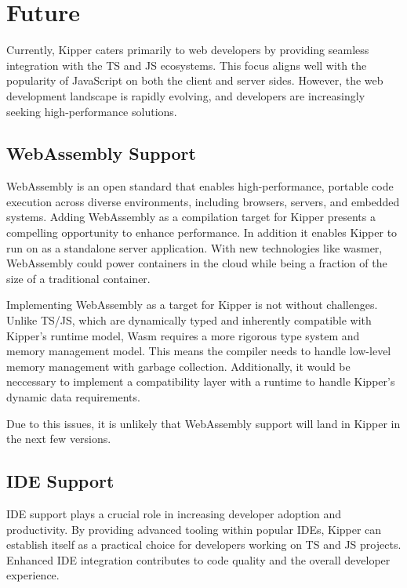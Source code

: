 \section{Future}
\label{sec:future}

Currently, Kipper caters primarily to web developers by providing seamless integration with the TS and JS ecosystems. This focus aligns well with the popularity of JavaScript on both the client and server sides. However, the web development landscape is rapidly evolving, and developers are increasingly seeking high-performance solutions.

\subsection{WebAssembly Support}

WebAssembly is an open standard that enables high-performance, portable code execution across diverse environments, including browsers, servers, and embedded systems. Adding WebAssembly as a compilation target for Kipper presents a compelling opportunity to enhance performance. In addition it enables Kipper to run on as a standalone server application. With new technologies like wasmer, WebAssembly could power containers in the cloud while being a fraction of the size of a traditional container.

Implementing WebAssembly as a target for Kipper is not without challenges. Unlike TS/JS, which are dynamically typed and inherently compatible with Kipper’s runtime model, Wasm requires a more rigorous type system and memory management model. This means the compiler needs to handle low-level memory management with garbage collection. Additionally, it would be neccessary to implement a compatibility layer with a runtime to handle Kipper's dynamic data requirements.

Due to this issues, it is unlikely that WebAssembly support will land in Kipper in the next few versions.

\subsection{IDE Support}
IDE support plays a crucial role in increasing developer adoption and productivity. By providing advanced tooling within popular IDEs, Kipper can establish itself as a practical choice for developers working on TS and JS projects. Enhanced IDE integration contributes to code quality and the overall developer experience.

